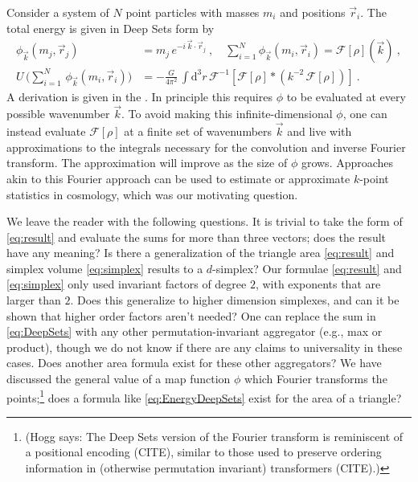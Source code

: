 \documentclass[10pt]{article}
\renewcommand{\d}{\mathrm{d}}
\newcommand{\Hogg}[1]{{\color{violet} (Hogg says: #1)}}
\begin{document}
Consider a system of $N$ point particles with masses $m_i$ and positions $\vec{r}_i$.
The total energy is given in Deep Sets form by
\begin{align}
    \phi_{\vec{k}}(m_j, \vec{r}_j)
    &=m_j \, e^{-i \, \vec{k} \cdot \vec{r}_j}
    ~,
    \quad
    \sum_{i=1}^{N} \phi_{\vec{k}}(m_i, \vec{r}_i)
    = \mathcal{F}[\rho](\vec{k})~,
    \nonumber\\
    U \, \big( \sum_{i=1}^{N} \, \phi_{\vec{k}}(m_i, \vec{r}_i) \big)
    &= -\frac{G}{4 \pi^2} \,
        \int \d^3 r \,
        \mathcal{F}^{-1} \left[
            \mathcal{F}[\rho] \ast \left(
            k^{-2} \, \mathcal{F}[\rho] \right)
        \right]~.
    \label{eq:EnergyDeepSets}
\end{align}
A derivation is given in the .
In principle this requires $\phi$ to be evaluated at every possible wavenumber $\vec{k}$.
To avoid making this infinite-dimensional $\phi$, one can instead evaluate $\mathcal{F}[\rho]$ at a finite set of wavenumbers $\vec{k}$ and live with approximations to the integrals necessary for the convolution and inverse Fourier transform.
The approximation will improve as the size of $\phi$ grows.
Approaches akin to this Fourier approach can be used \citep[and are used; e.g.,][]{Portillo+2018,Philcox+2022ENCORE} to estimate or approximate $k$-point statistics in cosmology, which was our motivating question.

We leave the reader with the following questions. 
It is trivial to take the form of \eqref{eq:result} and evaluate the sums for more than three vectors; does the result have any meaning?
Is there a generalization of the triangle area \eqref{eq:result} and simplex volume \eqref{eq:simplex} results to a $d$-simplex?
Our formulae \eqref{eq:result} and \eqref{eq:simplex} only used invariant factors of degree $2$, with exponents that are larger than $2$. Does this generalize to higher dimension simplexes, and can it be shown that higher order factors aren't needed?
One can replace the sum in \eqref{eq:DeepSets} with any other permutation-invariant aggregator (e.g., max or product), though we do not know if there are any claims to universality in these cases. Does another area formula exist for these other aggregators?
We have discussed the general value of a map function $\phi$ which Fourier transforms the points;\footnote{%
\Hogg{The Deep Sets version of the Fourier transform is reminiscent of a positional encoding (CITE), similar to those used to preserve ordering information in (otherwise permutation invariant) transformers (CITE).}}
does a formula like \eqref{eq:EnergyDeepSets} exist for the area of a triangle?
\end{document}
